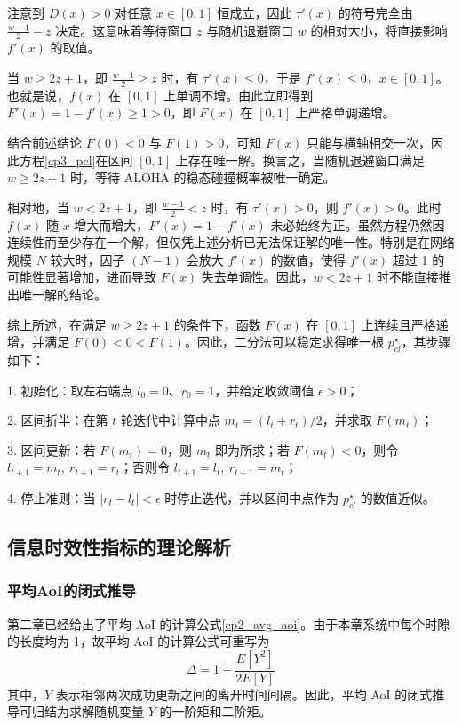 注意到 $D(x)>0$ 对任意 $x\in[0,1]$ 恒成立，因此 $\tau'(x)$ 的符号完全由 $\frac{w-1}{2}-z$ 决定。这意味着等待窗口 $z$ 与随机退避窗口 $w$ 的相对大小，将直接影响 $f'(x)$ 的取值。

当 $w\ge 2z+1$，即 $\frac{w-1}{2}\ge z$ 时，有 $\tau'(x)\le 0$，于是 $f'(x)\le 0$，$x\in[0,1]$。也就是说，$f(x)$ 在 $[0,1]$ 上单调不增。由此立即得到 $F'(x)=1-f'(x)\ge 1>0$，即 $F(x)$ 在 $[0,1]$ 上严格单调递增。

结合前述结论 $F(0)<0$ 与 $F(1)>0$，可知 $F(x)$ 只能与横轴相交一次，因此方程\eqref{cp3_pcl}在区间 $[0,1]$ 上存在唯一解。换言之，当随机退避窗口满足 $w\ge 2z+1$ 时，等待 ALOHA 的稳态碰撞概率被唯一确定。

相对地，当 $w<2z+1$，即 $\frac{w-1}{2}<z$ 时，有 $\tau'(x)>0$，则 $f'(x)>0$。此时 $f(x)$ 随 $x$ 增大而增大，$F'(x)=1-f'(x)$ 未必始终为正。虽然方程仍然因连续性而至少存在一个解，但仅凭上述分析已无法保证解的唯一性。特别是在网络规模 $N$ 较大时，因子 $(N-1)$ 会放大 $f'(x)$ 的数值，使得 $f'(x)$ 超过 1 的可能性显著增加，进而导致 $F(x)$ 失去单调性。因此，$w<2z+1$ 时不能直接推出唯一解的结论。

综上所述，在满足 $w\ge 2z+1$ 的条件下，函数 $F(x)$ 在 $[0,1]$ 上连续且严格递增，并满足 $F(0)<0<F(1)$。因此，二分法可以稳定求得唯一根 $p_{cl}^\star$，其步骤如下：

1. 初始化：取左右端点 $l_0=0$、$r_0=1$，并给定收敛阈值 $\epsilon>0$；

2. 区间折半：在第 $t$ 轮迭代中计算中点 $m_t=(l_t+r_t)/2$，并求取 $F(m_t)$；

3. 区间更新：若 $F(m_t)=0$，则 $m_t$ 即为所求；若 $F(m_t)<0$，则令 $l_{t+1}=m_t,\ r_{t+1}=r_t$；否则令 $l_{t+1}=l_t,\ r_{t+1}=m_t$；

4. 停止准则：当 $|r_t-l_t|<\epsilon$ 时停止迭代，并以区间中点作为 $p_{cl}^\star$ 的数值近似。

\subsection{信息时效性指标的理论解析}
\subsubsection{平均AoI的闭式推导}

第二章已经给出了平均 AoI 的计算公式\eqref{cp2_avg_aoi}。由于本章系统中每个时隙的长度均为 1，故平均 AoI 的计算公式可重写为
\begin{equation}\label{cp3_avg_aoi}
    \Delta = 1 + \frac{E[Y^2]}{2E[Y]}
\end{equation}
其中，$Y$ 表示相邻两次成功更新之间的离开时间间隔。因此，平均 AoI 的闭式推导可归结为求解随机变量 $Y$ 的一阶矩和二阶矩。

